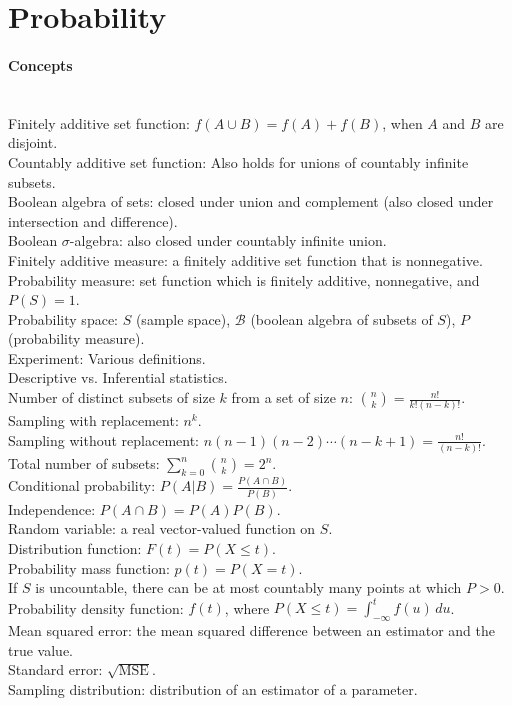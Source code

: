 \documentclass[10pt]{article}
\begin{document}
\bigskip\bigskip
\section{Probability}\smallskip

\paragraph{Concepts}\ \\
Finitely additive set function: $f(A \cup B) = f(A) + f(B)$, when $A$ and $B$ are disjoint.\\
Countably additive set function: Also holds for unions of countably infinite subsets.\\
Boolean algebra of sets: closed under union and complement (also closed under intersection and difference).\\
Boolean $\sigma$-algebra: also closed under countably infinite union.\\
Finitely additive measure: a finitely additive set function that is nonnegative.\\
Probability measure: set function which is finitely additive, nonnegative, and $P(S) = 1$.\\
Probability space: $S$ (sample space), ${\mathscr B}$ (boolean algebra of subsets of $S$), $P$ (probability measure).\\
Experiment: Various definitions.\\
Descriptive vs. Inferential statistics.\\
Number of distinct subsets of size $k$ from a set of size $n$: $\binom{n}{k} = \frac{n!}{k!(n-k)!}$.\\
Sampling with replacement: $n^k$.\\
Sampling without replacement: $n(n-1)(n-2) \dotsb (n-k+1) = \frac{n!}{(n-k)!}$.\\
Total number of subsets: $\sum_{k=0}^n \binom{n}{k} = 2^n$.\\
Conditional probability: $P(A|B) = \frac{P(A \cap B)}{P(B)}$.\\
Independence: $P(A \cap B) = P(A) P(B)$.\\
Random variable: a real vector-valued function on $S$.\\
Distribution function: $F(t) = P(X \leq t)$.\\
Probability mass function: $p(t) = P(X = t)$.\\
If $S$ is uncountable, there can be at most countably many points at which $P > 0$.\\
Probability density function: $f(t)$, where $P(X \leq t) = \int_{-\infty}^t f(u)\, du$.\\
Mean squared error: the mean squared difference between an estimator and the true value.\\
Standard error: $\sqrt{\text{MSE}}$.\\
Sampling distribution: distribution of an estimator of a parameter.
\end{document}
